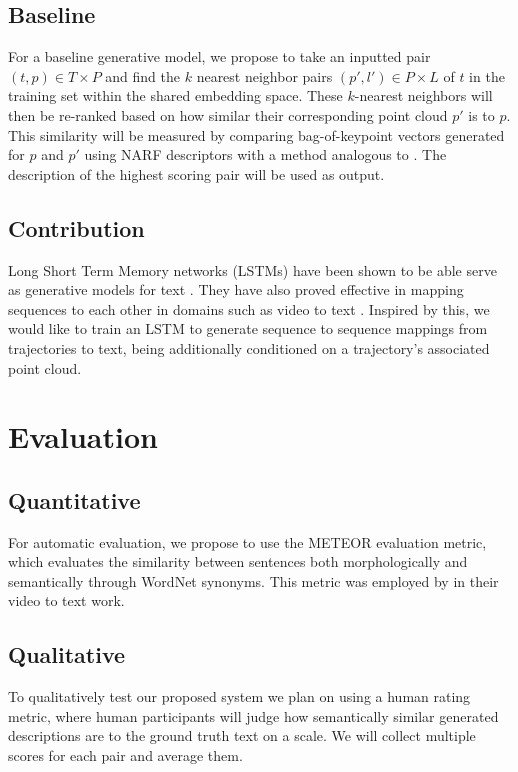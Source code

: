 \documentclass[letterpaper, 12 pt, conference]{ieeeconf}
\begin{document}
\subsection{Baseline}

For a baseline generative model, we propose to take an inputted pair $(t,p)\in T\times P$ and find the $k$ nearest neighbor pairs $(p',l')\in P\times L$ of $t$ in the training set within the shared embedding space. These $k$-nearest neighbors will then be re-ranked based on how similar their corresponding point cloud $p'$ is to $p$. This similarity will be measured by comparing bag-of-keypoint vectors generated for $p$ and  $p'$ using NARF \cite{steder2010narf} descriptors with a method analogous to \cite{csurka2004visual}. The description of the highest scoring pair will be used as output.    

\subsection{Contribution}

Long Short Term Memory networks (LSTMs) have been shown to be able serve as generative models for text \cite{graves2013generating}. They have also proved effective in mapping sequences to each other in domains such as video to text \cite{Venugopalan_2015_ICCV}. Inspired by this, we would like to train an LSTM to generate sequence to sequence mappings from trajectories to text, being additionally conditioned on a trajectory's associated point cloud. 

\section{Evaluation} 

\subsection{Quantitative}
For automatic evaluation, we propose to use the METEOR \cite{Denkowski14meteoruniversal} evaluation metric, which evaluates the similarity between sentences both morphologically and semantically through WordNet synonyms. This metric was employed by \cite{Venugopalan_2015_ICCV} in their video to text work. 

\subsection{Qualitative}

To qualitatively test our proposed system we plan on using a human rating metric, where human participants will judge how semantically similar generated descriptions are to the ground truth text on a scale. We will collect multiple scores for each pair and average them. 



\end{document}
